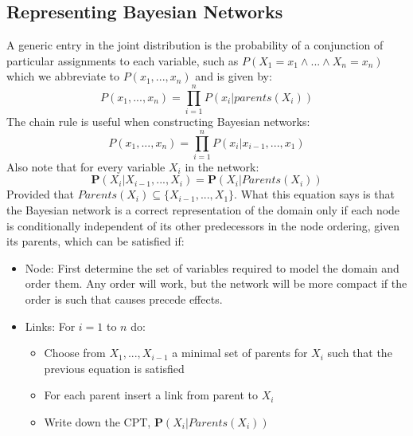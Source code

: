 \documentclass[twoside]{article}
\begin{document}
\subsection{Representing Bayesian Networks}
A generic entry in the joint distribution is the probability of a conjunction of
particular assignments to each variable, such as \(P(X_1=x_1 \land ... \land X_n = x_n)\)
which we abbreviate to \(P(x_1,...,x_n)\) and is given by:
\begin{equation}
        P(x_1,...,x_n) = \prod_{i=1}^n P(x_i|parents(X_i))
\end{equation}
The chain rule is useful when constructing Bayesian networks:
\begin{equation}
        P(x_1,...,x_n) = \prod_{i=1}^n P(x_i|x_{i-1},...,x_1)
\end{equation}
Also note that for every variable \(X_i\) in the network:
\begin{equation}
        \mathbf P(X_i|X_{i-1},...,X_i) = \mathbf P(X_i|Parents(X_i))
\end{equation}
Provided that \(Parents(X_i) \subseteq \{X_{i-1},...,X_1\}\). What this equation 
says is that the Bayesian network is a correct representation of the domain only 
if each node is conditionally independent of its other predecessors in the node 
ordering, given its parents, which can be satisfied if:
\begin{itemize}
        \item Node: First determine the set of variables required to model the 
        domain and order them. Any order will work, but the network will be more 
        compact if the order is such that causes precede effects.
        \item Links: For \(i=1\) to \(n\) do:
                \begin{itemize}
                        \item Choose from \(X_1,...,X_{i-1}\) a minimal set of 
                        parents for \(X_i\) such that the previous equation is 
                        satisfied
                        \item For each parent insert a link from parent to \(X_i\)
                        \item Write down the CPT, \(\mathbf P(X_i|Parents(X_i))\)
                \end{itemize}
\end{itemize}
\end{document}
